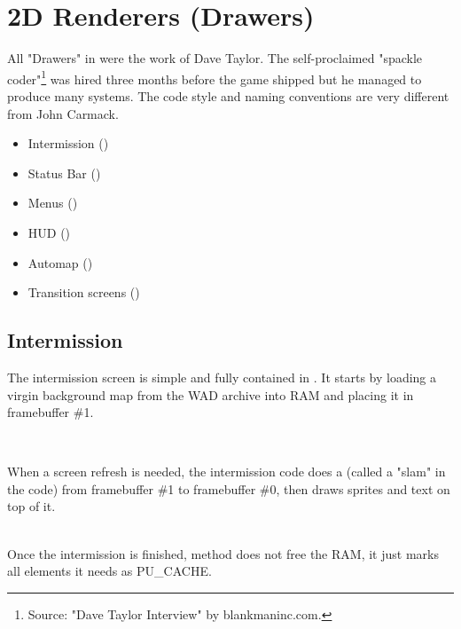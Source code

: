 
\section{2D Renderers (Drawers)}
All "Drawers" in \doom{} were the work of  Dave Taylor. The self-proclaimed "spackle coder"\footnote{Source: "Dave Taylor Interview" by blankmaninc.com.} was hired three months before the game shipped but he managed to produce many systems. The code style and naming conventions are very different from John Carmack.
\begin{itemize}
\item Intermission ()
\item Status Bar ()
\item Menus ()
\item HUD ()
\item Automap ()
\item Transition screens ()
\end{itemize} 
\par




\subsection{Intermission}
The intermission screen is simple and fully contained in . It starts by loading a virgin background map from the WAD archive into RAM and placing it in framebuffer \#1.\\
\par
{}\\
\par
When a screen refresh is needed, the intermission code does a  (called a "slam" in the code) from framebuffer \#1 to framebuffer \#0, then draws sprites and text on top of it.\\
\par
{}\\

Once the intermission is finished, method  does not free the RAM, it just marks all elements it needs as PU\_CACHE.\\




\par

